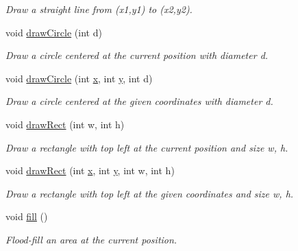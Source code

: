 \begin{DoxyCompactItemize}
\begin{DoxyCompactList}\small\item\em Draw a straight line from ({\ttfamily x1},{\ttfamily y1}) to ({\ttfamily x2},{\ttfamily y2}). \end{DoxyCompactList}\item 
void \hyperlink{classGUI_1_1Drawable_afcec69b9023bab1ea5267b5bfbc7a0ec}{draw\-Circle} (int d)
\begin{DoxyCompactList}\small\item\em Draw a circle centered at the current position with diameter {\ttfamily d}. \end{DoxyCompactList}\item 
void \hyperlink{classGUI_1_1Drawable_add0650ef9d31fa54a378856ceec2bb72}{draw\-Circle} (int \hyperlink{classGUI_1_1Drawable_a098294925bd310aa41080a2441790b80}{x}, int \hyperlink{classGUI_1_1Drawable_a574c99954cc268937f2c66ebe1332316}{y}, int d)
\begin{DoxyCompactList}\small\item\em Draw a circle centered at the given coordinates with diameter {\ttfamily d}. \end{DoxyCompactList}\item 
void \hyperlink{classGUI_1_1Drawable_a58a078deebc5a6dc55fd249268ea9f89}{draw\-Rect} (int w, int h)
\begin{DoxyCompactList}\small\item\em Draw a rectangle with top left at the current position and size {\ttfamily w}, {\ttfamily h}. \end{DoxyCompactList}\item 
void \hyperlink{classGUI_1_1Drawable_aeee95c349ff9948da7470458db11ee3c}{draw\-Rect} (int \hyperlink{classGUI_1_1Drawable_a098294925bd310aa41080a2441790b80}{x}, int \hyperlink{classGUI_1_1Drawable_a574c99954cc268937f2c66ebe1332316}{y}, int w, int h)
\begin{DoxyCompactList}\small\item\em Draw a rectangle with top left at the given coordinates and size {\ttfamily w}, {\ttfamily h}. \end{DoxyCompactList}\item 
void \hyperlink{classGUI_1_1Drawable_acdff088e5bc17e7024353aac19c178c6}{fill} ()
\begin{DoxyCompactList}\small\item\em Flood-\/fill an area at the current position. \end{DoxyCompactList}\item 

\end{DoxyCompactItemize}
